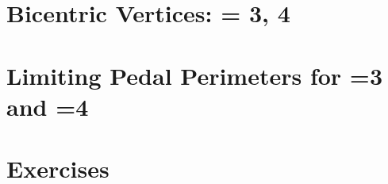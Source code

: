 \section{Bicentric Vertices: = 3, 4}
\label{sec:06=bicentric-vertices-n34}
 

\section{Limiting Pedal Perimeters for  =3 and  =4}
\label{sec:06-pedal-perimeters-n34}
 
 

\section{Exercises}
\label{sec:06-exercises}

